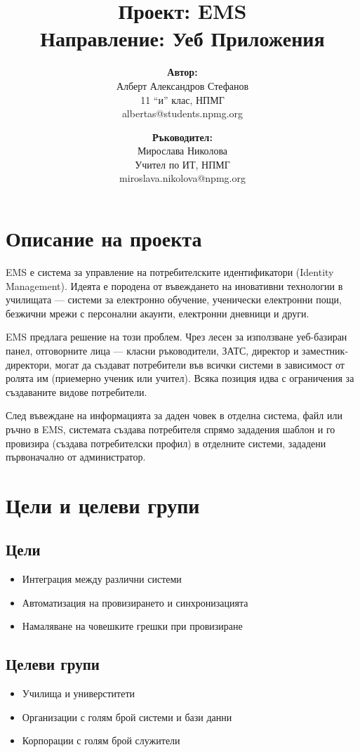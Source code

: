 \documentclass[bulgarian,a4paper,12pt,titlepage]{article}
\title{%
Проект: EMS \\
\large Направление: Уеб Приложения}
\author{%
\textbf{Автор:} \\
Алберт Александров Стефанов \\
11 ``и'' клас, НПМГ \\
albertas@students.npmg.org \\
\and
\textbf{Ръководител:} \\
Мирослава Николова \\
Учител по ИТ, НПМГ \\
miroslava.nikolova@npmg.org}
\date{}
\begin{document}
    \maketitle
    \newpage
    \tableofcontents
    \newpage
    
    \section{Описание на проекта}
        EMS е система за управление на потребителските идентификатори (Identity Management). Идеята е породена от въвеждането на иновативни технологии в училищата --- системи за електронно обучение, ученически електронни пощи, безжични мрежи с персонални акаунти, електронни дневници и други. \par
        EMS предлага решение на този проблем. Чрез лесен за използване уеб-базиран панел, отговорните лица --- класни ръководители, ЗАТС, директор и заместник-директори, могат да създават потребители във всички системи в зависимост от ролята им (приемерно ученик или учител). Всяка позиция идва с ограничения за създаваните видове потребители. \par
        След въвеждане на информацията за даден човек в отделна система, файл или ръчно в EMS, системата създава потребителя спрямо зададения шаблон и го провизира (създава потребителски профил) в отделните системи, зададени първоначално от администратор.
    
    \section{Цели и целеви групи}
        \subsection{Цели}
            \begin{itemize}
                \item Интеграция между различни системи
                \item Автоматизация на провизирането и синхронизацията
                \item Намаляване на човешките грешки при провизиране
            \end{itemize}

        \subsection{Целеви групи}
            \begin{itemize}
                \item Училища и универститети
                \item Организации с голям брой системи и бази данни
                \item Корпорации с голям брой служители
            \end{itemize}
    
\end{document}
